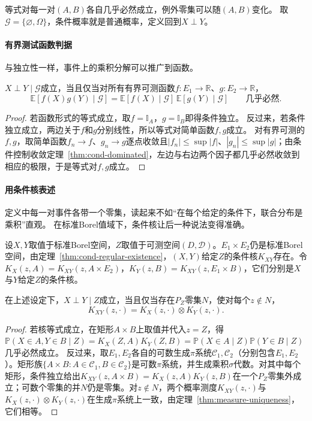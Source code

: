 等式对每一对$(A,B)$各自几乎必然成立，例外零集可以随$(A,B)$变化。
取$\mathcal G=\{\varnothing,\Omega\}$，条件概率就是普通概率，定义回到$X\perp Y$。

\paragraph{有界测试函数判据}
与独立性一样，事件上的乘积分解可以推广到函数。

\begin{lemma}[条件独立的函数判据]
\label{lem:cond-independence-functions}
$X\perp Y\mid\mathcal G$成立，当且仅当对所有有界可测函数$f:E_1\to\mathbb R$、$g:E_2\to\mathbb R$，
\[
  \mathbb E[f(X)g(Y)\mid\mathcal G]=\mathbb E[f(X)\mid\mathcal G]\,\mathbb E[g(Y)\mid\mathcal G]\qquad\text{几乎必然}.
\]
\end{lemma}

\begin{proof}
若函数形式的等式成立，取$f=\mathbb I_A$，$g=\mathbb I_B$即得条件独立。
反过来，若条件独立成立，两边关于$f$和$g$分别线性，所以等式对简单函数$f,g$成立。
对有界可测的$f,g$，取简单函数$f_n\to f$、$g_n\to g$逐点收敛且$|f_n|\leq\sup|f|$、$|g_n|\leq\sup|g|$；由条件控制收敛定理~\ref{thm:cond-dominated}，左边与右边两个因子都几乎必然收敛到相应的极限，于是等式对$f,g$成立。
\end{proof}

\paragraph{用条件核表述}
定义中每一对事件各带一个零集，读起来不如“在每个给定的条件下，联合分布是乘积”直观。
在标准Borel值域下，条件核让后一种说法变得准确。

设$X,Y$取值于标准Borel空间，$Z$取值于可测空间$(D,\mathcal D)$。$E_1\times E_2$仍是标准Borel空间，由定理~\ref{thm:cond-regular-existence}，$(X,Y)$给定$Z$的条件核$K_{XY}$存在。令$K_X(z,A)=K_{XY}(z,A\times E_2)$，$K_Y(z,B)=K_{XY}(z,E_1\times B)$，它们分别是$X$与$Y$给定$Z$的条件核。

\begin{theorem}[条件独立的核判据]
\label{thm:cond-independence-kernel}
在上述设定下，$X\perp Y\mid Z$成立，当且仅当存在$P_Z$零集$N$，使对每个$z\notin N$，
\[
  K_{XY}(z,\cdot)=K_X(z,\cdot)\otimes K_Y(z,\cdot).
\]
\end{theorem}

\begin{proof}
若核等式成立，在矩形$A\times B$上取值并代入$z=Z$，得$\mathbb P(X\in A,Y\in B\mid Z)=K_X(Z,A)K_Y(Z,B)=\mathbb P(X\in A\mid Z)\mathbb P(Y\in B\mid Z)$几乎必然成立。
反过来，取$E_1,E_2$各自的可数生成$\pi$系统$\mathcal C_1,\mathcal C_2$（分别包含$E_1,E_2$）。矩形族$\{A\times B:A\in\mathcal C_1,B\in\mathcal C_2\}$是可数$\pi$系统，并生成乘积$\sigma$代数。对其中每个矩形，条件独立给出$K_{XY}(z,A\times B)=K_X(z,A)K_Y(z,B)$在一个$P_Z$零集外成立；可数个零集的并$N$仍是零集。对$z\notin N$，两个概率测度$K_{XY}(z,\cdot)$与$K_X(z,\cdot)\otimes K_Y(z,\cdot)$在生成$\pi$系统上一致，由定理~\ref{thm:measure-uniqueness}，它们相等。
\end{proof}

